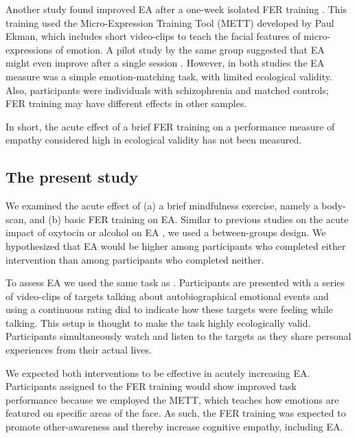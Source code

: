 \documentclass[authordate, empirical, issue]{jote-new-article}
\begin{document}
Another study found improved EA after a one-week isolated FER training \parencites{Russell2008}. This training used the Micro-Expression Training Tool (METT) developed by Paul Ekman, which includes short video-clips to teach the facial features of micro-expressions of emotion. A pilot study by the same group suggested that EA might even improve after a single session \parencites{Russell2006}. However, in both studies the EA measure was a simple emotion-matching task, with limited ecological validity. Also, participants were individuals with schizophrenia and matched controls; FER training may have different effects in other samples.



In short, the acute effect of a brief FER training on a performance measure of empathy considered high in ecological validity has not been measured.



\subsection{The present study}



We examined the acute effect of (a) a brief mindfulness exercise, namely a body-scan, and (b) basic FER training on EA. Similar to previous studies on the acute impact of oxytocin or alcohol on EA \parencites{Bartz2010}{Thiel2018}, we used a between-groups design. We hypothesized that EA would be higher among participants who completed either intervention than among participants who completed neither.



To assess EA we used the same task as \textcite{Thiel2018}. Participants are presented with a series of video-clips of targets talking about autobiographical emotional events and using a continuous rating dial to indicate how these targets were feeling while talking. This setup is thought to make the task highly ecologically valid. Participants simultaneously watch and listen to the targets as they share personal experiences from their actual lives.



We expected both interventions to be effective in acutely increasing EA. Participants assigned to the FER training would show improved task performance because we employed the METT, which teaches how emotions are featured on specific areas of the face. As such, the FER training was expected to promote other-awareness and thereby increase cognitive empathy, including EA.
\end{document}

